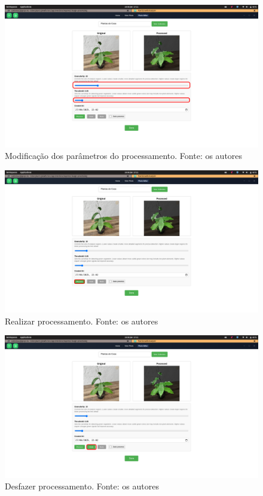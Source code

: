 \begin{figure}[H]
    \centering
    \includegraphics[width=1\textwidth]{../figures/screens/uc013/Screenshot from 2025-06-28 17-11-19.png}
    \caption{Modificação dos parâmetros do processamento. Fonte: os autores}
    \label{fig:uc013-screen3}
\end{figure}

\begin{figure}[H]
    \centering
    \includegraphics[width=1\textwidth]{../figures/screens/uc013/Screenshot from 2025-06-28 17-11-27.png}
    \caption{Realizar processamento. Fonte: os autores}
    \label{fig:uc013-screen4}
\end{figure}

\begin{figure}[H]
    \centering
    \includegraphics[width=1\textwidth]{../figures/screens/uc013/Screenshot from 2025-06-28 17-11-31.png}
    \caption{Desfazer processamento. Fonte: os autores}
    \label{fig:uc013-screen5}
\end{figure}

